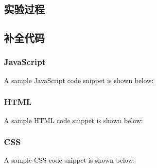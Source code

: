 \begin{sduDocument}
	\section{实验过程}
	\subsection{补全代码}
    \subsubsection{JavaScript}
    A sample JavaScript code snippet is shown below:
    
    
    \subsubsection{HTML}
    A sample HTML code snippet is shown below:
    
    
    \subsubsection{CSS}
    A sample CSS code snippet is shown below:
    
    

\end{sduDocument}
